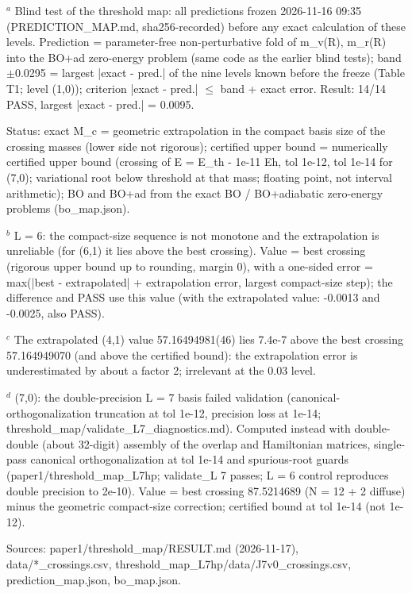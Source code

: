 \begin{table}[t]
\par\footnotesize $^a$ Blind test of the threshold map: all predictions frozen 2026-11-16 09:35 (PREDICTION\_MAP.md, sha256-recorded) before any exact calculation of these levels. Prediction = parameter-free non-perturbative fold of m\_v(R), m\_r(R) into the BO+ad zero-energy problem (same code as the earlier blind tests); band $\pm$0.0295 = largest |exact - pred.| of the nine levels known before the freeze (Table T1; level (1,0)); criterion |exact - pred.| $\le$ band + exact error. Result: 14/14 PASS, largest |exact - pred.| = 0.0095.
\par\footnotesize Status: exact M\_c = geometric extrapolation in the compact basis size of the crossing masses (lower side not rigorous); certified upper bound = numerically certified upper bound (crossing of E = E\_th - 1e-11 Eh, tol 1e-12, tol 1e-14 for (7,0); variational root below threshold at that mass; floating point, not interval arithmetic); BO and BO+ad from the exact BO / BO+adiabatic zero-energy problems (bo\_map.json).
\par\footnotesize $^b$ L = 6: the compact-size sequence is not monotone and the extrapolation is unreliable (for (6,1) it lies above the best crossing). Value = best crossing (rigorous upper bound up to rounding, margin 0), with a one-sided error = max(|best - extrapolated| + extrapolation error, largest compact-size step); the difference and PASS use this value (with the extrapolated value: -0.0013 and -0.0025, also PASS).
\par\footnotesize $^c$ The extrapolated (4,1) value 57.16494981(46) lies 7.4e-7 above the best crossing 57.164949070 (and above the certified bound): the extrapolation error is underestimated by about a factor 2; irrelevant at the 0.03 level.
\par\footnotesize $^d$ (7,0): the double-precision L = 7 basis failed validation (canonical-orthogonalization truncation at tol 1e-12, precision loss at 1e-14; threshold\_map/validate\_L7\_diagnostics.md). Computed instead with double-double (about 32-digit) assembly of the overlap and Hamiltonian matrices, single-pass canonical orthogonalization at tol 1e-14 and spurious-root guards (paper1/threshold\_map\_L7hp; validate\_L 7 passes; L = 6 control reproduces double precision to 2e-10). Value = best crossing 87.5214689 (N = 12 + 2 diffuse) minus the geometric compact-size correction; certified bound at tol 1e-14 (not 1e-12).
\par\footnotesize Sources: paper1/threshold\_map/RESULT.md (2026-11-17), data/*\_crossings.csv, threshold\_map\_L7hp/data/J7v0\_crossings.csv, prediction\_map.json, bo\_map.json.
\end{table}

